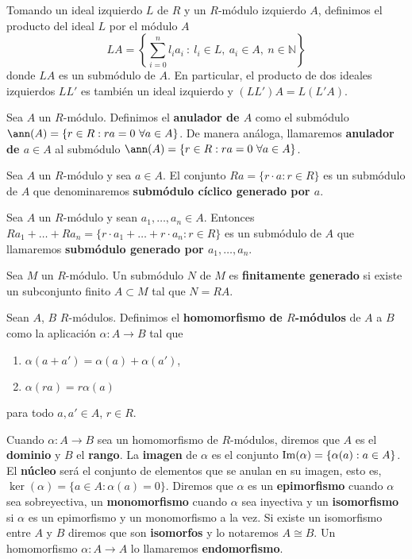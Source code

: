Tomando un ideal izquierdo $L$ de $R$ y un $R$-módulo izquierdo $A$, definimos
el producto del ideal $L$ por el módulo $A$
\[ LA = \left\lbrace \sum_{i=0}^n l_ia_i \ : \ l_i \in L,\ a_i \in A,\ n \in \mathbb{N} \right\rbrace \]
donde $LA$ es un submódulo de $A$. En particular, el producto de dos ideales
izquierdos $LL'$ es también un ideal izquierdo y $(LL')A = L(L'A)$.
\begin{definicion}
	Sea $A$ un $R$-módulo. Definimos el \textbf{anulador de $A$} como el submódulo $\ann(A) = \{r \in R : ra=0 \ \forall a \in A\}$. De manera análoga, llamaremos \textbf{anulador de $a \in A$} al submódulo $\ann(A) = \{r \in R : ra=0 \ \forall a \in A\}$.
\end{definicion}
\begin{definicion}
	Sea $A$ un $R$-módulo y sea $a \in A$. El conjunto $Ra = \{r \cdot a : r \in R\}$ es un submódulo de $A$ que denominaremos \textbf{submódulo cíclico generado por $a$}.
\end{definicion}
\begin{definicion}
	Sea $A$ un $R$-módulo y sean $a_1, \dots, a_n \in A$. Entonces $Ra_1 + \dots + Ra_n = \{r \cdot a_1 + \dots + r \cdot a_n : r \in R\}$ es un submódulo de $A$ que llamaremos \textbf{submódulo generado por $a_1, \dots, a_n$}.
\end{definicion}
\begin{definicion}
	Sea $M$ un $R$-módulo. Un submódulo $N$ de $M$ es \textbf{finitamente generado} si existe un subconjunto finito $A \subset M$ tal que $N = RA$.
\end{definicion}
\begin{definicion}
	Sean $A$, $B$ $R$-módulos. Definimos el \textbf{homomorfismo de $R$-módulos} de $A$ a $B$ como la aplicación $\alpha: A \rightarrow B$ tal que
	\begin{enumerate}
		\item $\alpha(a+a') = \alpha(a) + \alpha(a')$,
		\item $\alpha(ra) = r\alpha(a)$
	\end{enumerate}
	para todo $a,a' \in A$, $r \in R$.
\end{definicion}

Cuando $\alpha: A \rightarrow B$ sea un homomorfismo de $R$-módulos, diremos
que $A$ es el \textbf{dominio} y $B$ el \textbf{rango}. La \textbf{imagen} de
$\alpha$ es el conjunto $\operatorname{Im}(\alpha) = \{ \alpha(a) : a \in A \}$. El
\textbf{núcleo} será el conjunto de elementos que se anulan en su imagen, esto
es, $\ker(\alpha) = \{ a \in A : \alpha(a) = 0 \}$. Diremos que $\alpha$ es un
\textbf{epimorfismo} cuando $\alpha$ sea sobreyectiva, un \textbf{monomorfismo}
cuando $\alpha$ sea inyectiva y un \textbf{isomorfismo} si $\alpha$ es un
epimorfismo y un monomorfismo a la vez. Si existe un isomorfismo entre $A$ y
$B$ diremos que son \textbf{isomorfos} y lo notaremos $A \cong B$. Un
homomorfismo $\alpha: A \rightarrow A$ lo llamaremos \textbf{endomorfismo}.


